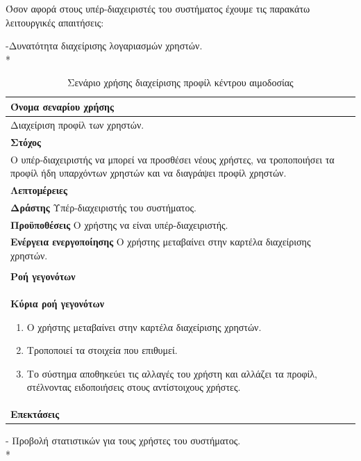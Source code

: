 			
Όσον αφορά στους υπέρ-διαχειριστές του συστήματος έχουμε τις παρακάτω λειτουργικές απαιτήσεις:


-Δυνατότητα διαχείρισης λογαριασμών χρηστών.
\\*
\begin{table}[H]
	\begin{center}
	    \begin{tabular}{|p{\dimexpr \linewidth-2\tabcolsep}|}
	    \hline
	    \rowcolor{grayy}
	    \textbf{Όνομα σεναρίου χρήσης}
	    \\ \hline    
	    Διαχείριση προφίλ των χρηστών.
	     \\ \hline
	    \rowcolor{grayy}
	    \textbf{\textbf{Στόχος}}
	    \\ \hline
	 	 Ο υπέρ-διαχειριστής να μπορεί να προσθέσει νέους χρήστες, να τροποποιήσει τα προφίλ ήδη υπαρχόντων χρηστών και να διαγράψει προφίλ χρηστών.
	     \\ \hline	    
	     \rowcolor{grayy}
	    \textbf{Λεπτομέρειες}
	    \\ \hline
		\textbf{Δράστης} Υπέρ-διαχειριστής του συστήματος. 
		\\*
		\textbf{Προϋποθέσεις} Ο χρήστης να είναι υπέρ-διαχειριστής.
		\\*
		\textbf{Ενέργεια ενεργοποίησης} Ο χρήστης μεταβαίνει στην καρτέλα διαχείρισης χρηστών.
				\\ \hline
	    \\ \hline
		\rowcolor{grayy}    
	    \textbf{Ροή γεγονότων}
	    \\* 
		\textbf{Κύρια ροή γεγονότων}
		\begin{enumerate}
			\item	 Ο χρήστης μεταβαίνει στην καρτέλα διαχείρισης χρηστών.
			\item Τροποποιεί τα στοιχεία που επιθυμεί.
			\item Το σύστημα αποθηκεύει τις αλλαγές του χρήστη και αλλάζει τα προφίλ, στέλνοντας ειδοποιήσεις στους αντίστοιχους χρήστες.
		\end{enumerate}
		\\*
		\textbf{Επεκτάσεις}
		   \\ \hline
	    \end{tabular}
	    \caption{Σενάριο χρήσης διαχείρισης προφίλ κέντρου αιμοδοσίας}
	    \label{tab:profile_management_superadmin}
	\end{center}
\end{table}	



- Προβολή στατιστικών για τους χρήστες του συστήματος.
\\*		


